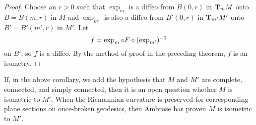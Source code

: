 \documentclass[../main]{subfiles}
\begin{document}
\begin{proof} 
Choose an $r>0$ such that $\exp_m$ is a diffeo from $B(0,r)$ in $\ts Mm$ onto $B=B(m,r)$ in $M$ and $\exp_{m'}$ is also a diffeo from $B'(0,r)$ in $\ts{M'}{m'}$ onto $B'=B'(m',r)$ in $M'$. Let
\[f=\exp_m\circ F\circ(\exp_{m'})\inv\]
on $B'$, so $f$ is a diffeo. By the method of proof in the preceding theorem, $f$ is an isometry.
\end{proof}



If, in the above corollary, we add the hypothesis that $M$ and $M'$ are complete, connected, and simply connected, then it is an open question whether $M$ is isometric to $M'$. When the Riemannian curvature is preserved for corresponding plane sections on once-broken geodesics, then Ambrose \cite{ambrose1956parallel} has proven $M$ is isometric to $M'$.
\end{document}
